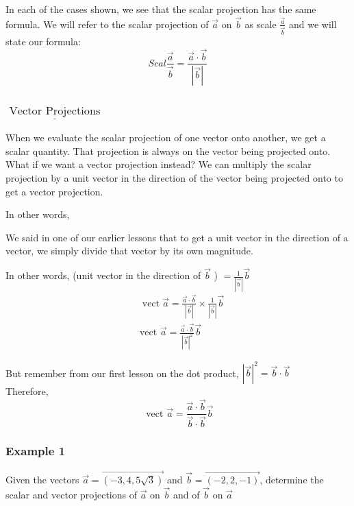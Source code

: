 \documentclass{article}
\begin{document}
\begin{tcolorbox}[enhanced,frame style image=blueshade.png,
  opacityback=0.75,opacitybacktitle=0.25,
  colback=blue!5!white,colframe=blue!75!black] 
In each of the cases shown, we see that the scalar projection has the same formula. We will refer to the scalar projection of $\vec{a}$ on $\vec{b}$ as scale $\frac{\vec{a}}{\vec{b}}$ and we will state our formula:
$$Scal\frac{\vec{a}}{\vec{b}}=\frac{\vec{a}\cdot \vec{b}}{|\vec{b}|}$$

\end{tcolorbox}


\subsubsection{$\underline{\text { Vector Projections }}$}

When we evaluate the scalar projection of one vector onto another, we get a scalar quantity.
That projection is always on the vector being projected onto.
What if we want a vector projection instead?
We can multiply the scalar projection by a unit vector in the direction of the vector being projected onto to get a vector projection.

In other words,

We said in one of our earlier lessons that to get a unit vector in the direction of a vector, we simply divide that vector by its own magnitude.

In other words, (unit vector in the direction of $\vec{b}$ ) $=\frac{1}{|\vec{b}|} \vec{b}$
$$
\begin{aligned}
& \operatorname{vect} \vec{a}=\frac{\vec{a} \cdot \vec{b}}{|\vec{b}|} \times \frac{1}{|\vec{b}|} \vec{b} \\
& \text{vect } \vec{a}=\frac{\vec{a} \cdot \vec{b}}{|\vec{b}|^2} \vec{b}
\end{aligned}
$$

But remember from our first lesson on the dot product, $|\vec{b}|^2=\vec{b} \cdot \vec{b}$\\
Therefore,
$$
\text { vect } \vec{a}=\frac{\vec{a} \cdot \vec{b}}{\vec{b} \cdot \vec{b}} \vec{b}
$$

\subsubsection*{Example 1}
Given the vectors $\vec{a}=\overrightarrow{(-3,4,5 \sqrt{3})}$ and $\vec{b}=\overrightarrow{(-2,2,-1)}$, determine the scalar and vector projections of $\vec{a}$ on $\vec{b}$ and of $\vec{b}$ on $\vec{a}$
\end{document}
